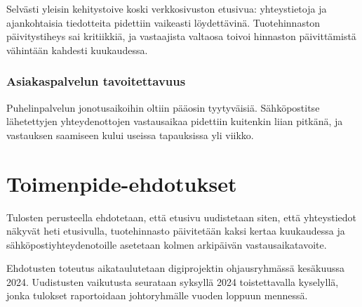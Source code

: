 \documentclass{sfs-2487-2024}
\begin{document}
Selvästi yleisin kehitystoive koski verkkosivuston etusivua:
yhteystietoja ja ajankohtaisia tiedotteita pidettiin vaikeasti
löydettävinä. Tuotehinnaston päivitystiheys sai kritiikkiä, ja
vastaajista valtaosa toivoi hinnaston päivittämistä vähintään
kahdesti kuukaudessa.

\subsubsection{Asiakaspalvelun tavoitettavuus}

Puhelinpalvelun jonotusaikoihin oltiin pääosin tyytyväisiä.
Sähköpostitse lähetettyjen yhteydenottojen vastausaikaa pidettiin
kuitenkin liian pitkänä, ja vastauksen saamiseen kului useissa
tapauksissa yli viikko.

\section{Toimenpide-ehdotukset}

Tulosten perusteella ehdotetaan, että etusivu uudistetaan siten,
että yhteystiedot näkyvät heti etusivulla, tuotehinnasto päivitetään
kaksi kertaa kuukaudessa ja sähköpostiyhteydenotoille asetetaan
kolmen arkipäivän vastausaikatavoite.

Ehdotusten toteutus aikataulutetaan digiprojektin ohjausryhmässä
kesäkuussa 2024. Uudistusten vaikutusta seurataan syksyllä 2024
toistettavalla kyselyllä, jonka tulokset raportoidaan johtoryhmälle
vuoden loppuun mennessä.

\vspace{\parskip}




\vspace{\parskip}

\makecontactinfo
\end{document}
